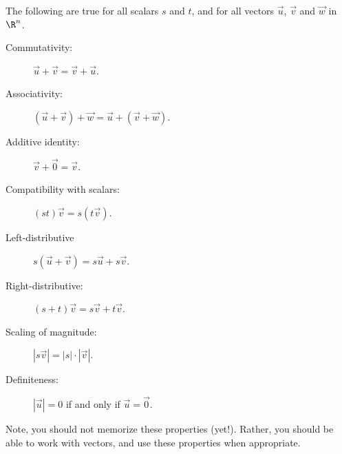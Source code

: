 \documentclass{ximera}
\begin{document}
\begin{theorem}
The following are true for all scalars $s$ and $t$, and for all
vectors $\vec u$, $\vec v$ and $\vec w$ in
$\R^n$.
\begin{description}
\item[Commutativity:] $\vec u+\vec v = \vec v+\vec u$.
\item[Associativity:] $(\vec u+\vec v)+\vec w = \vec u+(\vec v+\vec w)$.
\item[Additive identity:] $\vec v+\vec 0 = \vec v$.
\item[Compatibility with scalars:] $(st)\vec v= s(t\vec v)$.
\item[Left-distributive] $s(\vec u+\vec v) = s\vec u+s\vec v$.
\item[Right-distributive:] $(s+t)\vec v = s\vec v+t\vec v$.
\item[Scaling of magnitude:] $|s\vec v| = |s|\cdot|\vec v|$.
\item[Definiteness:] $|\vec{u}| = 0$ if and only if $\vec u = \vec 0$.
\end{description}
\end{theorem}
Note, you should not memorize these properties (yet!). Rather, you should be
able to work with vectors, and use these properties when appropriate.
\end{document}
